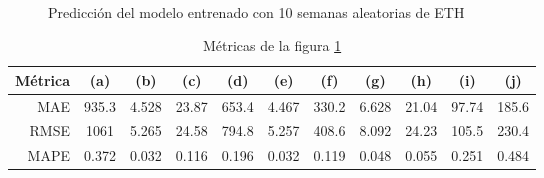 \documentclass[a4paper,10pt]{article}
\begin{document}
\begin{figure}[H]
    \\
  \caption{Predicción del modelo entrenado con 10 semanas aleatorias de ETH}
  \label{f:eth_wk_arima}
\end{figure}

\begin{table}[H]
 \begin{center}
  \begin{tabular}{|r|c|c|c|c|c|c|c|c|c|c|}
    Métrica & (a) & (b) & (c) & (d) & (e) & (f) & (g) & (h) & (i) & (j) \\ \hline
    MAE & 935.3 & 4.528 & 23.87 & 653.4 & 4.467 & 330.2 & 6.628 & 21.04 & 97.74 & 185.6 \\
    RMSE & 1061 & 5.265 & 24.58 & 794.8 & 5.257 & 408.6 & 8.092 & 24.23 & 105.5 & 230.4 \\
    MAPE & 0.372 & 0.032 & 0.116 & 0.196 & 0.032 & 0.119 & 0.048 & 0.055 & 0.251 & 0.484 \\ \hline
  \end{tabular}
  \caption{Métricas de la figura \ref{f:eth_wk_arima}}
  \label{tab:eth}
 \end{center}
\end{table}
\end{document}
